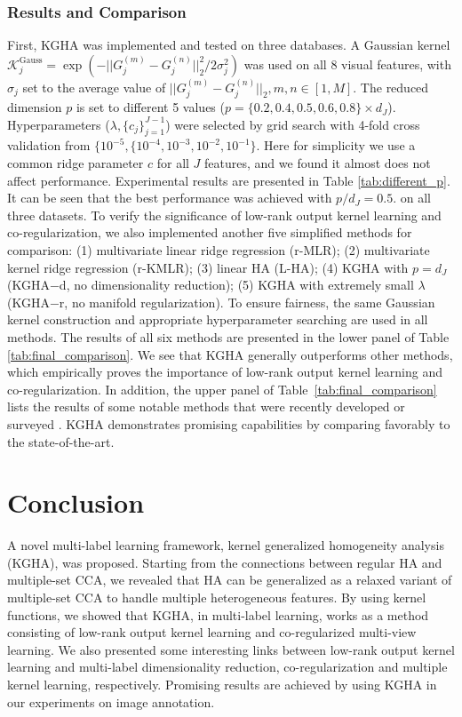 \documentclass[a4paper]{article}
\begin{document}
\subsubsection{Results and Comparison}
First, KGHA was implemented and tested on three databases. A Gaussian kernel 
$\mathcal{K}^{\textrm{Gauss}}_j=\exp (-||G_j^{(m)}-G_j^{(n)}||_2^2/2\sigma^2_j)$ 
was used on all 8 visual features, with $\sigma_j$ set to the average value of $||G_j^{(m)}-G_j^{(n)}||_2, 
m,n\in[1,M]$. The reduced dimension $p$ is set to different 5 values ($p=\{0.2, 0.4,0.5, 0.6,0.8\}\times d_J$). 
Hyperparameters ($\lambda, \{c_j\}_{j=1}^{J-1}$) were selected by grid search with 4-fold cross validation from  
$\{10^{-5}, \{10^{-4},10^{-3},10^{-2},10^{-1}\}$. Here for simplicity we use a common ridge parameter $c$ for all $J$ features, and we found it almost does not 
affect performance. Experimental results are presented in Table \ref{tab:different_p}. It can be seen that the best performance was achieved with $p/d_J=0.5$.   
on all three datasets. 
To verify the significance of low-rank output kernel learning and co-regularization, we also implemented another five simplified methods for  
comparison: (1) multivariate linear ridge regression (r-MLR); (2) multivariate kernel ridge regression (r-KMLR); (3) linear HA (L-HA);    
(4) KGHA with $p=d_J$ (KGHA$-$d, no dimensionality reduction);  (5) KGHA with extremely small $\lambda$ (KGHA$-$r, no manifold regularization).  
To ensure fairness, the same Gaussian kernel construction and appropriate hyperparameter searching are used in all methods. The results of all six methods are presented in 
the lower panel of Table \ref{tab:final_comparison}. We see that KGHA generally outperforms other methods, which empirically proves the importance of
low-rank output kernel learning and co-regularization.  
In addition, the upper panel of Table~\ref{tab:final_comparison} lists
the results of some notable methods that were recently developed or
surveyed \cite{GMVS09,baseline,chen_2013_icml}. KGHA demonstrates
promising capabilities by comparing favorably to the state-of-the-art.

\section{Conclusion}
A novel multi-label learning framework, kernel generalized homogeneity analysis (KGHA),  was proposed. Starting from the connections between regular HA and 
multiple-set CCA, we revealed that HA can be generalized as a relaxed variant of multiple-set CCA to handle multiple heterogeneous features. By using kernel 
functions, we showed that KGHA, in multi-label learning, works as a method consisting of  low-rank output kernel learning and co-regularized multi-view learning. 
We also presented some interesting links between low-rank output kernel learning and multi-label dimensionality reduction, co-regularization and multiple kernel learning, 
respectively. Promising results are achieved by using KGHA in our experiments on image annotation.



\end{document}
